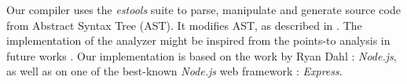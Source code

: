 

Our compiler uses the \textit{estools} suite to parse, manipulate and generate source code from Abstract Syntax Tree (AST).
It modifies AST, as described in \cite{Jones2003}.
The implementation of the analyzer might be inspired from the points-to analysis in future works \cite{Wei2014}.
Our implementation is based on the work by Ryan Dahl : \textit{Node.js}, as well as on one of the best-known \textit{Node.js} web framework : \textit{Express}.